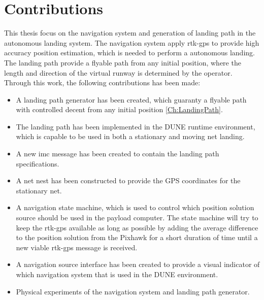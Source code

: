 \section{Contributions}
This thesis focus on the navigation system and generation of landing path in the autonomous landing system. The navigation system apply \gls{rtk-gps} to provide high accuracy position estimation, which is needed to perform a autonomous landing. The landing path provide a flyable path from any initial position, where the length and direction of the virtual runway is determined by the operator. Through this work, the following contributions has been made:
\begin{itemize}
\item A landing path generator has been created, which guaranty a flyable path with controlled decent from any initial position \ref{Ch:LandingPath}.
\item The landing path has been implemented in the DUNE runtime environment, which is capable to be used in both a stationary and moving net landing.
\item A new \gls{imc} message has been created to contain the landing path specifications.
\item A net nest has been constructed to provide the GPS coordinates for the stationary net.
\item A navigation state machine, which is used to control which position solution source should be used in the payload computer. The state machine will try to keep the \gls{rtk-gps} available as long as possible by adding the average difference to the position solution from the Pixhawk for a short duration of time until a new viable \gls{rtk-gps} message is received.
\item  A navigation source interface has been created to provide a visual indicator of which navigation system that is used in the DUNE environment.
\item Physical experiments of the navigation system and landing path generator.
\end{itemize}
\cleardoublepage